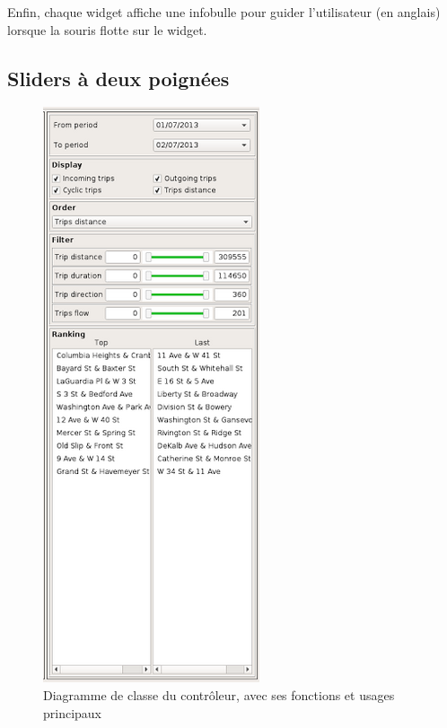 \documentclass[12pt]{article}
\begin{document}
	Enfin, chaque widget affiche une infobulle pour guider l’utilisateur (en anglais) lorsque la souris flotte sur le widget.
	
	\clearpage
	\subsection{Sliders à deux poignées} \label{probleme_sliders}
		\begin{figure}[!h]
		\begin{center}
		\includegraphics[scale=.6]{interface_sliders.png}
		\caption{Diagramme de classe du contrôleur, avec ses fonctions et usages principaux}
		\label{fig:screen_sliders}
		\end{center}
		\end{figure}
	
\end{document}
